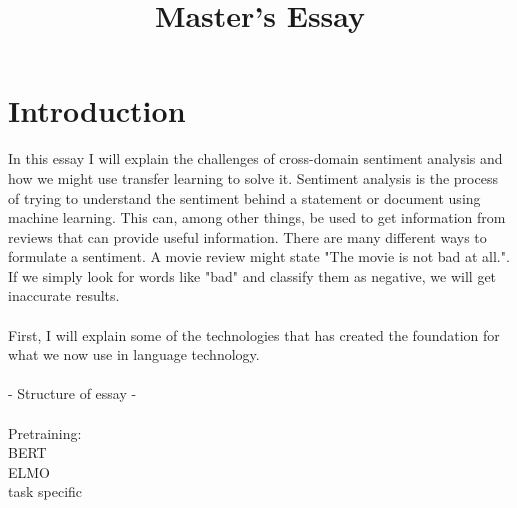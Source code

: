\documentclass{report}
\begin{document}
\title{Master's Essay}
\duoforside[author={Adrian Eriksen}, dept={Department of Informatics}, program={Language Technology}]

\setcounter{secnumdepth}{0}

\section{Introduction}
In this essay I will explain the challenges of cross-domain sentiment analysis and how we might use transfer learning to solve it.
Sentiment analysis is the process of trying to understand the sentiment behind a statement or document using machine learning. This can, among other things, be used to get information from reviews that can provide useful information.
There are many different ways to formulate a sentiment. A movie review might state "The movie is not bad at all.". If we simply look for words like "bad" and classify them as negative, we will get inaccurate results.\\\\
First, I will explain some of the technologies that has created the foundation for what we now use in language technology.
\\\\  - Structure of essay - \\\\
Pretraining:\\ 
BERT\\
ELMO\\
task specific\\


\newpage
\end{document}
